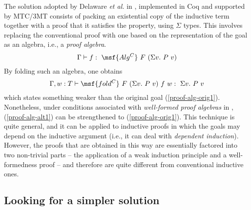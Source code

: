 \documentclass[submission,copyright,creativecommons]{eptcs}
\newcounter{prop}
\begin{document}
The solution adopted by Delaware \emph{et al.} in \cite{Dela13},
implemented in Coq and supported by MTC/3MT consists of packing an
existential copy of the inductive term together with a proof that it
satisfies the property, using $\Sigma$ types. This involves replacing
the conventional proof with one based on the representation of the
goal as an algebra, i.e., a \emph{proof algebra}.
\begin{gather} \label{proof-alg-alt1}
\Gamma \vdash f: \ \msf{Alg^C} \ F \ (\Sigma v. \ P \ v)
\end{gather}
By folding such an algebra, one obtains
\begin{gather}
\Gamma, w:T \vdash \msf{fold^C} \ F \ (\Sigma v. \ P \ v) \ f \ w:
\ \Sigma v. \ P \ v
\end{gather}
which states something weaker than the original goal
(\ref{proof-alg-orig1}). Nonetheless, under conditions associated with
\emph{well-formed proof algebras} in \cite{Dela13},
(\ref{proof-alg-alt1}) can be strengthened to (\ref{proof-alg-orig1}).
This technique is quite general, and it can be applied to inductive
proofs in which the goals may depend on the inductive argument (i.e.,
it can deal with \emph{dependent induction}). However, the proofs that
are obtained in this way are essentially factored into two non-trivial
parts -- the application of a weak induction principle and a
well-formedness proof -- and therefore are quite different from
conventional inductive ones.

\subsection{Looking for a simpler solution}
\end{document}
